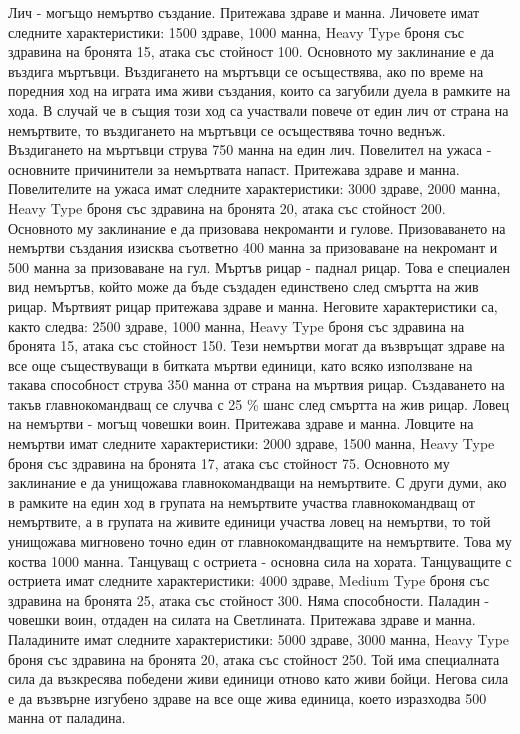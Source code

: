 Лич -\/ могъщо немъртво създание. Притежава здраве и манна. Личовете имат следните характеристики\+: 1500 здраве, 1000 манна, Heavy Type броня със здравина на бронята 15, атака със стойност 100. Основното му заклинание е да въздига мъртъвци. Въздигането на мъртъвци се осъществява, ако по време на поредния ход на играта има живи създания, които са загубили дуела в рамките на хода. В случай че в същия този ход са участвали повече от един лич от страна на немъртвите, то въздигането на мъртъвци се осъществява точно веднъж. Въздигането на мъртъвци струва 750 манна на един лич. Повелител на ужаса -\/ основните причинители за немъртвата напаст. Притежава здраве и манна. Повелителите на ужаса имат следните характеристики\+: 3000 здраве, 2000 манна, Heavy Type броня със здравина на бронята 20, атака със стойност 200. Основното му заклинание е да призовава некроманти и гулове. Призоваването на немъртви създания изисква съответно 400 манна за призоваване на некромант и 500 манна за призоваване на гул. Мъртъв рицар -\/ паднал рицар. Това е специален вид немъртъв, който може да бъде създаден единствено след смъртта на жив рицар. Мъртвият рицар притежава здраве и манна. Неговите характеристики са, както следва\+: 2500 здраве, 1000 манна, Heavy Type броня със здравина на бронята 15, атака със стойност 150. Тези немъртви могат да възвръщат здраве на все още съществуващи в битката мъртви единици, като всяко използване на такава способност струва 350 манна от страна на мъртвия рицар. Създаването на такъв главнокомандващ се случва с 25 \% шанс след смъртта на жив рицар. Ловец на немъртви -\/ могъщ човешки воин. Притежава здраве и манна. Ловците на немъртви имат следните характеристики\+: 2000 здраве, 1500 манна, Heavy Type броня със здравина на бронята 17, атака със стойност 75. Основното му заклинание е да унищожава главнокомандващи на немъртвите. С други думи, ако в рамките на един ход в групата на немъртвите участва главнокомандващ от немъртвите, а в групата на живите единици участва ловец на немъртви, то той унищожава мигновено точно един от главнокомандващите на немъртвите. Това му коства 1000 манна. Танцуващ с остриета -\/ основна сила на хората. Танцуващите с остриета имат следните характеристики\+: 4000 здраве, Medium Type броня със здравина на бронята 25, атака със стойност 300. Няма способности. Паладин -\/ човешки воин, отдаден на силата на Светлината. Притежава здраве и манна. Паладините имат следните характеристики\+: 5000 здраве, 3000 манна, Heavy Type броня със здравина на бронята 20, атака със стойност 250. Той има специалната сила да възкресява победени живи единици отново като живи бойци. Негова сила е да възвърне изгубено здраве на все още жива единица, което изразходва 500 манна от паладина.

